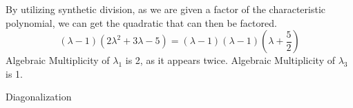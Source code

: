\documentclass[12pt]{article}
\newenvironment{problem}[2][Problem]{\begin{trivlist}
\item[\hskip \labelsep {\bfseries #1}\hskip \labelsep {\bfseries #2.}]}{\end{trivlist}}
\begin{document}
\begin{problem}{2}
\end{problem}
By utilizing synthetic division, as we are given a factor of the characteristic polynomial, we can get the quadratic that can then be factored.\\
\[(\lambda -1)(2\lambda^2 + 3\lambda -5) = (\lambda -1)(\lambda -1)(\lambda + \frac{5}{2})\]
Algebraic Multiplicity of $\lambda_1$ is 2, as it appears twice. Algebraic Multiplicity of $\lambda_3$ is 1.\\


\begin{problem}{3}
	Diagonalization 
\end{problem}
\end{document}
